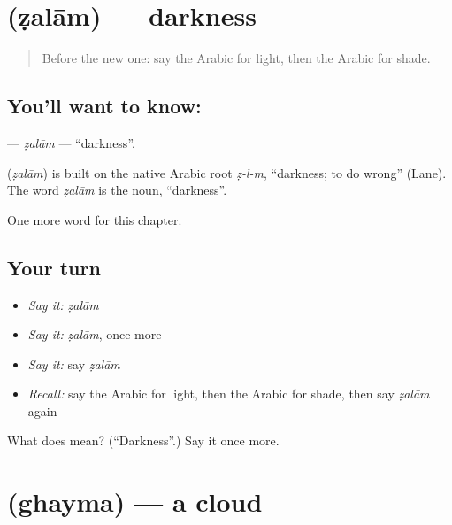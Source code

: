 \section[\texorpdfstring{\ar{ظلام} (ẓalām)}{ظلام (ẓalām)}]{ (ẓalām) — darkness}

\label{lesson:AR-C134-zalam}



\begin{quote}
Before the new one: say the Arabic for light, then the Arabic for shade.
\end{quote}

\subsection*{You'll want to know: }
\textbf{} — \emph{ẓalām} — \textquotedblleft{}darkness\textquotedblright{}.

\begin{cousinweb}
\textbf{} (\emph{ẓalām}) is built on the native Arabic root \emph{ẓ-l-m}, \textquotedblleft{}darkness; to do wrong\textquotedblright{} (Lane). The word \emph{ẓalām} is the noun, \textquotedblleft{}darkness\textquotedblright{}.
\end{cousinweb}

\begin{grammarlens}[title={What you've built}]
One more word for this chapter.
\end{grammarlens}

\subsection*{Your turn}
\begin{itemize}
\raggedright
  \item \emph{Say it:} \emph{ẓalām}
  \item \emph{Say it:} \emph{ẓalām}, once more
  \item \emph{Say it:} say \emph{ẓalām}
  \item \emph{Recall:} say the Arabic for light, then the Arabic for shade, then say \emph{ẓalām} again
\end{itemize}

\begin{tcolorbox}[breakable,colback=teal!4,colframe=teal!35!black,title={Before you move on}]
What does  mean? (\textquotedblleft{}Darkness\textquotedblright{}.) Say it once more.
\end{tcolorbox}
\section[\texorpdfstring{\ar{غيمة} (ghayma)}{غيمة (ghayma)}]{ (ghayma) — a cloud}

